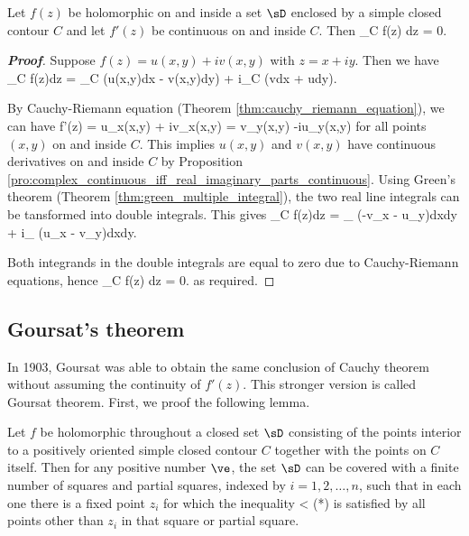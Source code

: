 \begin{theorem}
Let $f(z)$ be holomorphic on and inside a set $\sD$ enclosed by a simple closed contour $C$ and let $f'(z)$ be continuous on and inside $C$. Then
\be
\oint_C f(z) dz = 0.
\ee
\end{theorem}

\begin{proof}[\bf Proof]
Suppose $f(z) = u(x,y) + iv(x,y)$ with $z = x+iy$. Then we have
\be
\oint_C f(z)dz = \oint_C (u(x,y)dx - v(x,y)dy) + i\oint_C (vdx + udy).
\ee

By Cauchy-Riemann equation (Theorem \ref{thm:cauchy_riemann_equation}), we can have
\be
f'(z) = u_x(x,y) + iv_x(x,y) = v_y(x,y) -iu_y(x,y)
\ee
for all points $(x,y)$ on and inside $C$. This implies $u(x,y)$ and $v(x,y)$ have continuous derivatives on and inside $C$ by Proposition \ref{pro:complex_continuous_iff_real_imaginary_parts_continuous}. Using Green's theorem (Theorem \ref{thm:green_multiple_integral}), the two real line integrals can be tansformed into double integrals. This gives
\be
\oint_C f(z)dz = \iint_{\sD} (-v_x - u_y)dxdy + i\iint_{\sD} (u_x - v_y)dxdy.
\ee

Both integrands in the double integrals are equal to zero due to Cauchy-Riemann equations, hence
\be
\oint_C f(z) dz = 0.
\ee
as required.
\end{proof}





\subsection{Goursat's theorem}

In 1903, Goursat was able to obtain the same conclusion of Cauchy theorem without assuming the continuity of $f'(z)$. This stronger version is called Goursat theorem. First, we proof the following lemma.

\begin{lemma}\label{lem:holomorphic_function_with_cover_of_finitely_many_squares}
Let $f$ be holomorphic throughout a closed set $\sD$ consisting of the points interior to a positively oriented simple closed contour $C$ together with the points on $C$ itself. Then for any positive number $\ve$, the set $\sD$ can be covered with a finite number of squares and partial squares, indexed by $i=1,2,\dots,n$, such that in each one there is a fixed point $z_i$ for which the inequality
\be
{} < \ve\qquad \qquad (*)
\ee
is satisfied by all points other than $z_i$ in that square or partial square.
\end{lemma}


